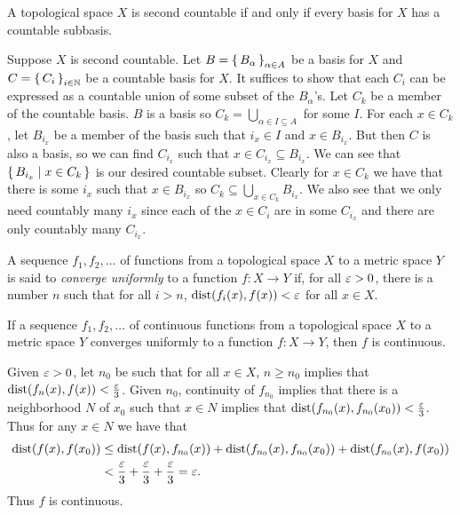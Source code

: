 \documentclass[letterpaper, 11pt, oneside]{book}
\begin{document}
\begin{prop}
  A topological space $X$ is second countable if and only if every basis for $X$ has a countable subbasis.
\end{prop}
\begin{pf}
  Suppose $X$ is second countable.
  Let $B = \set{B_{\alpha}}_{\alpha \in A}$ be a basis for $X$ and $C = \set{C_{i}}_{i \in \mathbb{N}}$ be a countable basis for $X$.
  It suffices to show that each $C_{i}$ can be expressed as a countable union of some subset of the $B_{\alpha}$'s.
  Let $C_{k}$ be a member of the countable basis.
  $B$ is a basis so $C_{k} = \bigcup_{\alpha \in I \subseteq A}$ for some $I$.
  For each $x \in C_{k}$, let $B_{i_{x}}$ be a member of the basis such that $i_{x} \in I$ and $x \in B_{i_{x}}$.
  But then $C$ is also a basis, so we can find $C_{i_{x}}$ such that $x \in C_{i_{x}} \subseteq B_{i_{x}}$.
  We can see that $\set{B_{i_{x}} | x \in C_{k}}$ is our desired countable subset.
  Clearly for $x \in C_{k}$ we have that there is some $i_{x}$ such that $x \in B_{i_{x}}$ so $C_{k} \subseteq \bigcup_{x \in C_{k}} B_{i_{x}}$.
  We also see that we only need countably many $i_{x}$ since each of the $x \in C_{i}$ are in some $C_{i_{x}}$ and there are only countably many $C_{i_{x}}$.
\end{pf}

\begin{defn}
  A sequence $f_{1}, f_{2}, \ldots$ of functions from a topological space $X$ to a metric space $Y$ is said to \emph{converge uniformly} to a function $f\colon X \to Y$ if, for all $\varepsilon > 0$, there is a number $n$ such that for all $i > n$, $\operatorname{dist}(f_{i}(x), f(x)) < \varepsilon$ for all $x \in X$.
\end{defn}

\begin{thrm}
  If a sequence $f_{1}, f_{2}, \ldots$ of continuous functions from a topological space $X$ to a metric space $Y$ converges uniformly to a function $f\colon X \to Y$, then $f$ is continuous.
\end{thrm}
\begin{pf}
  Given $\varepsilon > 0$, let $n_{0}$ be such that for all $x \in X$, $n \geq n_{0}$ implies that $\operatorname{dist}(f_{n}(x), f(x)) < \frac{\varepsilon}{3}$.
  Given $n_{0}$, continuity of $f_{n_{0}}$ implies that there is a neighborhood $N$ of $x_{0}$ such that $x \in N$ implies that $\operatorname{dist}(f_{n_{0}}(x), f_{n_{0}}(x_{0})) < \frac{\varepsilon}{3}$.
  Thus for any $x \in N$ we have that
  \begin{align*}
    \operatorname{dist}(f(x), f(x_{0})) &\leq \operatorname{dist}(f(x), f_{n_{0}}(x)) + \operatorname{dist}(f_{n_{0}}(x), f_{n_{0}}(x_{0})) + \operatorname{dist}(f_{n_{0}}(x), f(x_{0})) \\
                          &< \frac{\varepsilon}{3} + \frac{\varepsilon}{3} + \frac{\varepsilon}{3} = \varepsilon.
  \end{align*}
  Thus $f$ is continuous.
\end{pf}
\end{document}
